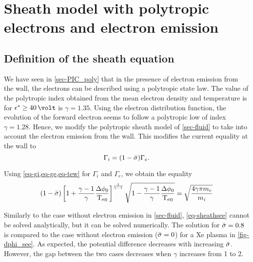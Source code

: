 
\section{Sheath model with polytropic electrons and electron emission}
\label{sec-fluid_poly_see}

\let\oldrightmark=\rightmark
\renewcommand\rightmark{\expandafter\MakeUppercase{Sheath with polytropic electron and SEE}}


\subsection{Definition of the sheath equation} \label{subsec-def_sheat_see}

We have seen in \cref{sec-PIC_poly} that in the presence of electron emission from the wall, the electrons can be described using a polytropic state law.
The value of the polytropic index obtained from the mean electron density and temperature is for $\crover \geq 40 \,\volt$ is $\gamma = 1.35$.
Using the electron distribution function, the evolution of the forward electron seems to follow a polytropic low of index $\gamma=1.28$.
Hence, we modify the polytropic sheath model of \cref{sec-fluid} to take into account the electron emission from the wall.
This modifies the current equality at the wall to
\begin{equation} \label{eq-see-J_eq}
  \Gamma_i = (1 -  \bar{\sigma }) \Gamma_e.
\end{equation}

Using \cref{eq-gi,eq-ge,eq-tew} for $\Gamma_i$ and $\Gamma_e$, we obtain the equality
\begin{equation}\label{eq-sheathsee}
  (1 -  \bar{\sigma } )\left[ 1 +\frac{\gamma -1}{\gamma} \frac{ \Delta \phi_0}{ \mathrm{T_e}_0}  \right]^{\frac{1}{\gamma - 1}} \sqrt{1 - \frac{\gamma -1}{\gamma}\frac{\Delta \phi_0}{\mathrm{T_e}_0}} = \sqrt{\frac{4 \gamma \pi m_e}{m_i}}
\end{equation}

Similarly to the case without electron emission in \cref{sec-fluid}, \cref{eq-sheathsee} cannot be solved analytically, but it can be solved numerically.
The solution for $ \bar{\sigma }=0.8$ is compared to the case without electron emission ($ \bar{\sigma }=0$) for a \ac{Xe} plasma in \cref{fig-dphi_see}.
As expected, the potential difference decreases with increasing $ \bar{\sigma }$.
However, the gap between the two cases decreases when $\gamma$ increases from 1 to 2.

